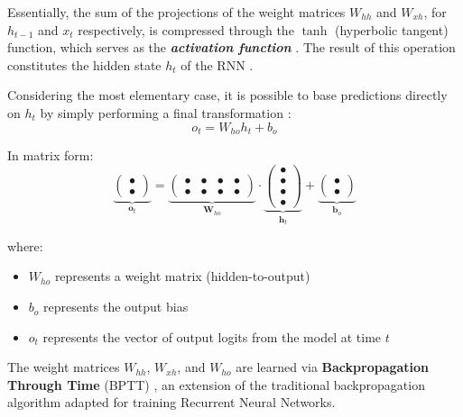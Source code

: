 Essentially, the sum of the projections of the weight matrices $W_{hh}$ and $W_{xh}$, for $h_{t-1}$ and $x_t$ respectively, is compressed through the $\tanh$ (hyperbolic tangent) function, which serves as the \textbf{\textit{activation function}} \cite{medium_math_rnn}. The result of this operation constitutes the hidden state $h_t$ of the RNN \cite{cs231n-rnn}.

Considering the most elementary case, it is possible to base predictions directly on $h_t$ by simply performing a final transformation \cite{medium_math_rnn, quarkml-rnn-explained}:
\begin{equation}
o_t = W_{ho}h_t + b_o
\end{equation}


In matrix form:
\begin{equation}
\underbrace{
\begin{pmatrix} \bullet \\ \bullet \end{pmatrix}
}_{\mathbf{o}_t}
=
\underbrace{
\begin{pmatrix}
\bullet & \bullet & \bullet & \bullet \\
\bullet & \bullet & \bullet & \bullet
\end{pmatrix}
}_{\mathbf{W}_{ho}}
\cdot
\underbrace{
\begin{pmatrix} \bullet \\ \bullet \\ \bullet \\ \bullet \end{pmatrix}
}_{\mathbf{h}_t}
+
\underbrace{
\begin{pmatrix} \bullet \\ \bullet \end{pmatrix}
}_{\mathbf{b}_o}
\end{equation}

where:
\begin{itemize}
\item $W_{ho}$ represents a weight matrix (hidden-to-output)
\item $b_o$ represents the output bias
\item $o_t$ represents the vector of output logits from the model at time $t$
\end{itemize}

The weight matrices $W_{hh}$, $W_{xh}$, and $W_{ho}$ are learned via \textbf{Backpropagation Through Time} (BPTT) \cite{quarkml-bptt}, an extension of the traditional backpropagation algorithm adapted for training Recurrent Neural Networks.

